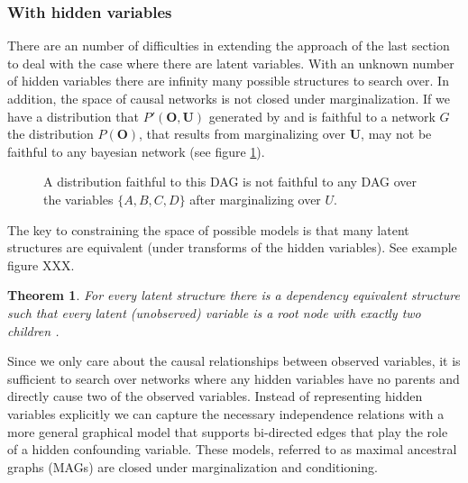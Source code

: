 \documentclass[11pt,a4paper,oneside]{book}
\newtheorem{theorem}{Theorem}
\begin{document}

\subsubsection{With hidden variables}
There are an number of difficulties in extending the approach of the last section to deal with the case where there are latent variables. With an unknown number of hidden variables there are infinity many possible structures to search over. In addition, the space of causal networks is not closed under marginalization. If we have a distribution that $P'(\boldsymbol{O},\boldsymbol{U})$ generated by and is faithful to a network $G$ the distribution $P(\boldsymbol{O})$, that results from marginalizing over $\boldsymbol{U}$, may not be faithful to any bayesian network (see figure \ref{fig:DAGSnotclosed}).

\begin{figure}
\centering
\caption{A distribution faithful to this DAG is not faithful to any DAG over the variables $\{A,B,C,D\}$ after marginalizing over $U$. }
\label{fig:DAGSnotclosed}
\end{figure}
 

The key to constraining the space of possible models is that many latent structures are equivalent (under transforms of the hidden variables). See example figure XXX.

\begin{theorem}
\cite{Verma1993} For every latent structure there is a dependency equivalent structure such that every latent (unobserved) variable is a root node with exactly two children .
\end{theorem}

Since we only care about the causal relationships between observed variables, it is sufficient to search over networks where any hidden variables have no parents and directly cause two of the observed variables. Instead of representing hidden variables explicitly we can capture the necessary independence relations with a more general graphical model that supports bi-directed edges that play the role of a hidden confounding variable. These models, referred to as maximal ancestral graphs (MAGs) are closed under marginalization and conditioning. 
\end{document}

